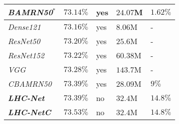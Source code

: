 \documentclass[fleqn,10pt]{SelfArx}
\begin{document}
\begin{center}
\begin{tabular}{||p{2.2cm} | p{1.3cm} | p{0.7cm} | p{1.2cm} | p{0.8cm}||}
\hline
\hline
\textit{BAMRN50}\cite{resmaskingnet}$^{*}$       & \hspace{0.15cm}$73.14\%$               & \hspace{0.12cm}yes   & \hspace{0.05cm}$24.07$M & $1.62\%$\\
\hline
\hline
\textit{Dense121}\cite{resmaskingnet}       & \hspace{0.15cm}$73.16\%$               & \hspace{0.12cm}yes   & \hspace{0.12cm}$8.06$M & \hspace{0.4cm}-\\
\hline
\hline
\textit{ResNet50}\cite{khanzada2020facial}       & \hspace{0.15cm}$73.20\%$               & \hspace{0.12cm}yes   & \hspace{0.12cm}$25.6$M & \hspace{0.4cm}-\\
\hline
\hline
\textit{ResNet152}\cite{resmaskingnet}       & \hspace{0.15cm}$73.22\%$               & \hspace{0.12cm}yes   & \hspace{0.05cm}$60.38$M & \hspace{0.4cm}-\\
\hline
\hline
\textit{VGG}\cite{khaireddin2021facial}       & \hspace{0.15cm}$73.28\%$               & \hspace{0.12cm}yes   & \hspace{0.05cm}$143.7$M & \hspace{0.4cm}-\\
\hline
\hline
\textit{CBAMRN50}\cite{resmaskingnet}       & \hspace{0.15cm}$73.39\%$               & \hspace{0.12cm}yes   & \hspace{0.05cm}$28.09$M & \hspace{0.2cm}$9\%$\\
\hline
\hline
\textbf{\textit{LHC-Net}}                      & \hspace{0.15cm}$\mathbf{73.39\%}$ & \hspace{0.15cm}no  & \hspace{0.12cm}$32.4$M & $14.8\%$\\
\hline
\hline
\textbf{\textit{LHC-NetC}}                    & \hspace{0.15cm}$\mathbf{73.53\%}$ & \hspace{0.15cm}no  & \hspace{0.12cm}$32.4$M & $14.8\%$\\

\end{tabular}
\end{center}
\end{document}
